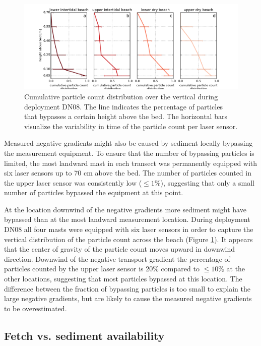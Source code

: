 \begin{figure}
 \centering
  \includegraphics[width=\columnwidth]{../Figures/particlecounts_distheight}
  \caption{Cumulative particle count distribution over the vertical
    during deployment DN08. The line indicates the percentage of
    particles that bypasses a certain height above the bed. The
    horizontal bars visualize the variability in time of the particle
    count per laser sensor.}
  \label{fig:pc_distheight}
\end{figure}

Measured negative gradients might also be caused by sediment locally
bypassing the measurement equipment. To ensure that the number of
bypassing particles is limited, the most landward mast in each
transect was permanently equipped with six laser sensors up to 70 cm
above the bed. The number of particles counted in the upper laser
sensor was consistently low ($\leq 1\%$), suggesting that only a small
number of particles bypassed the equipment at this point.

At the location downwind of the negative gradients more sediment might
have bypassed than at the most landward measurement location. During
deployment DN08 all four masts were equipped with six laser sensors in
order to capture the vertical distribution of the particle count
across the beach (Figure \ref{fig:pc_distheight}). It appears that the
center of gravity of the particle count moves upward in downwind
direction.%
Downwind of the negative transport gradient the
percentage of particles counted by the upper laser sensor is 20\%
compared to $\leq 10\%$ at the other locations, suggesting that most
particles bypassed at this location. The difference between the
fraction of bypassing particles is too small to explain the large
negative gradients, but are likely to cause the measured negative
gradients to be overestimated.

\subsection{Fetch vs. sediment availability}

